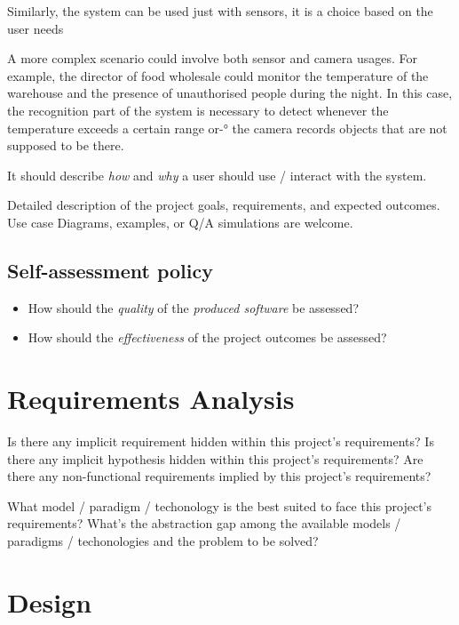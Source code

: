 \documentclass{scrartcl}
\begin{document}
    Similarly, the system can be used just with sensors, it is a choice based on the user needs

    A more complex scenario could involve both sensor and camera usages.
    For example, the director of food wholesale could monitor the temperature of the warehouse and the presence of
    unauthorised people during the night.
    In this case, the recognition part of the system is necessary to detect whenever the
    temperature exceeds a certain range or-° the camera records objects that are not supposed to be there.

%
    It should describe \emph{how} and \emph{why} a user should use / interact with the system.


    Detailed description of the project goals, requirements, and expected outcomes.
%
    Use case Diagrams, examples, or Q/A simulations are welcome.

    \subsection{Self-assessment policy}

    \begin{itemize}
        \item How should the \emph{quality} of the \emph{produced software} be assessed?

        \item How should the \emph{effectiveness} of the project outcomes be assessed?
    \end{itemize}


    \section{Requirements Analysis}

    Is there any implicit requirement hidden within this project's requirements?
%
    Is there any implicit hypothesis hidden within this project's requirements?
%
    Are there any non-functional requirements implied by this project's requirements?

    What model / paradigm / techonology is the best suited to face this project's requirements?
%
    What's the abstraction gap among the available models / paradigms / techonologies and the problem to be solved?


    \section{Design}
\end{document}
